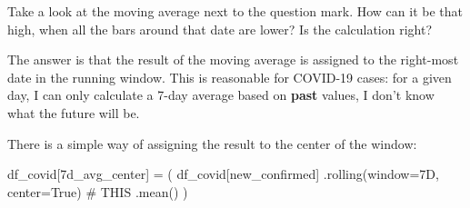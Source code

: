 \documentclass[
  letterpaper,
  DIV=11,
  numbers=noendperiod,
  oneside]{scrreprt}
\newenvironment{Shaded}{\begin{snugshade}}{\end{snugshade}}
\newcommand{\CommentTok}[1]{\textcolor[rgb]{0.37,0.37,0.37}{#1}}
\newcommand{\NormalTok}[1]{\textcolor[rgb]{0.00,0.23,0.31}{#1}}
\newcommand{\OperatorTok}[1]{\textcolor[rgb]{0.37,0.37,0.37}{#1}}
\newcommand{\StringTok}[1]{\textcolor[rgb]{0.13,0.47,0.30}{#1}}
\newcommand{\VariableTok}[1]{\textcolor[rgb]{0.07,0.07,0.07}{#1}}
\begin{document}
Take a look at the moving average next to the question mark. How can it
be that high, when all the bars around that date are lower? Is the
calculation right?

The answer is that the result of the moving average is assigned to the
right-most date in the running window. This is reasonable for COVID-19
cases: for a given day, I can only calculate a 7-day average based on
\textbf{past} values, I don't know what the future will be.

There is a simple way of assigning the result to the center of the
window:

\begin{Shaded}
\begin{Highlighting}[]
\NormalTok{df\_covid[}\StringTok{\textquotesingle{}7d\_avg\_center\textquotesingle{}}\NormalTok{] }\OperatorTok{=}\NormalTok{ (}
\NormalTok{                             df\_covid[}\StringTok{\textquotesingle{}new\_confirmed\textquotesingle{}}\NormalTok{]}
\NormalTok{                                 .rolling(window}\OperatorTok{=}\StringTok{\textquotesingle{}7D\textquotesingle{}}\NormalTok{,}
\NormalTok{                                          center}\OperatorTok{=}\VariableTok{True}\NormalTok{)  }\CommentTok{\# THIS}
\NormalTok{                                 .mean()}
\NormalTok{                            )}
\end{Highlighting}
\end{Shaded}
\end{document}
